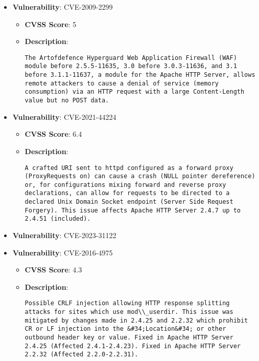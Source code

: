 \documentclass{article}
\begin{document}
\begin{itemize}
        \item \textbf{Vulnerability}: CVE-2009-2299
        \begin{itemize}
            \item \textbf{CVSS Score}:  5 
            \item \textbf{Description}:
            \parbox[t]{0.9\linewidth}{
                \verb|The Artofdefence Hyperguard Web Application Firewall (WAF) module before 2.5.5-11635, 3.0 before 3.0.3-11636, and 3.1 before 3.1.1-11637, a module for the Apache HTTP Server, allows remote attackers to cause a denial of service (memory consumption) via an HTTP request with a large Content-Length value but no POST data.|
            }
        \end{itemize}
    
        \item \textbf{Vulnerability}: CVE-2021-44224
        \begin{itemize}
            \item \textbf{CVSS Score}:  6.4 
            \item \textbf{Description}:
            \parbox[t]{0.9\linewidth}{
                \verb|A crafted URI sent to httpd configured as a forward proxy (ProxyRequests on) can cause a crash (NULL pointer dereference) or, for configurations mixing forward and reverse proxy declarations, can allow for requests to be directed to a declared Unix Domain Socket endpoint (Server Side Request Forgery). This issue affects Apache HTTP Server 2.4.7 up to 2.4.51 (included).|
            }
        \end{itemize}
    
        \item \textbf{Vulnerability}: CVE-2023-31122
    
        \item \textbf{Vulnerability}: CVE-2016-4975
        \begin{itemize}
            \item \textbf{CVSS Score}:  4.3 
            \item \textbf{Description}:
            \parbox[t]{0.9\linewidth}{
                \verb|Possible CRLF injection allowing HTTP response splitting attacks for sites which use mod\\_userdir. This issue was mitigated by changes made in 2.4.25 and 2.2.32 which prohibit CR or LF injection into the &#34;Location&#34; or other outbound header key or value. Fixed in Apache HTTP Server 2.4.25 (Affected 2.4.1-2.4.23). Fixed in Apache HTTP Server 2.2.32 (Affected 2.2.0-2.2.31).|
            }
        \end{itemize}
    

\end{itemize}
\end{document}
